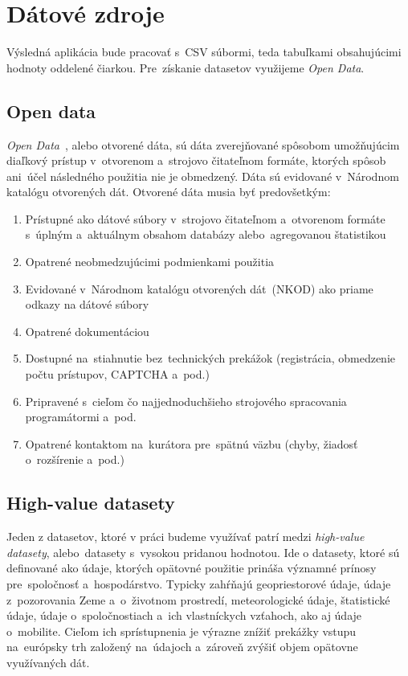 \chapter{Dátové zdroje}

Výsledná aplikácia bude pracovať s~CSV súbormi, teda tabuľkami obsahujúcimi hodnoty oddelené čiarkou. Pre~získanie datasetov využijeme \textit{Open Data}.

\section{Open data}

\textit{Open Data}~\cite{opendata}, alebo otvorené dáta, sú dáta zverejňované spôsobom umožňujúcim diaľkový prístup v~otvorenom a~strojovo čitateľnom formáte, ktorých spôsob ani~účel následného použitia nie je obmedzený. Dáta sú evidované v~Národnom katalógu otvorených dát. Otvorené dáta musia byť predovšetkým:

\begin{enumerate}
\item Prístupné ako dátové súbory v~strojovo čitateľnom a~otvorenom formáte s~úplným a~aktuálnym obsahom databázy alebo~agregovanou štatistikou
\item Opatrené neobmedzujúcimi podmienkami použitia
\item Evidované v~Národnom katalógu otvorených dát~(NKOD) ako priame odkazy na dátové súbory
\item Opatrené dokumentáciou
\item Dostupné na~stiahnutie bez~technických prekážok (registrácia, obmedzenie počtu prístupov, CAPTCHA a~pod.)
\item Pripravené s~cieľom čo najjednoduchšieho strojového spracovania programátormi a~pod.
\item Opatrené kontaktom na~kurátora pre~spätnú väzbu (chyby, žiadosť o~rozšírenie a~pod.)
\end{enumerate}

\section{High-value datasety}

Jeden z datasetov, ktoré v práci budeme využívať patrí medzi \textit{high-value datasety}\cite{highvaluedatasets}, alebo~datasety s~vysokou pridanou hodnotou. Ide o datasety, ktoré sú definované ako údaje, ktorých opätovné použitie prináša významné prínosy pre~spoločnosť a~hospodárstvo. Typicky zahŕňajú geopriestorové údaje, údaje z~pozorovania Zeme a~o~životnom prostredí, meteorologické údaje, štatistické údaje, údaje o~spoločnostiach a~ich vlastníckych vzťahoch, ako aj údaje o~mobilite. Cieľom ich sprístupnenia je výrazne znížiť prekážky vstupu na~európsky trh založený na~údajoch a~zároveň zvýšiť objem opätovne využívaných dát.
